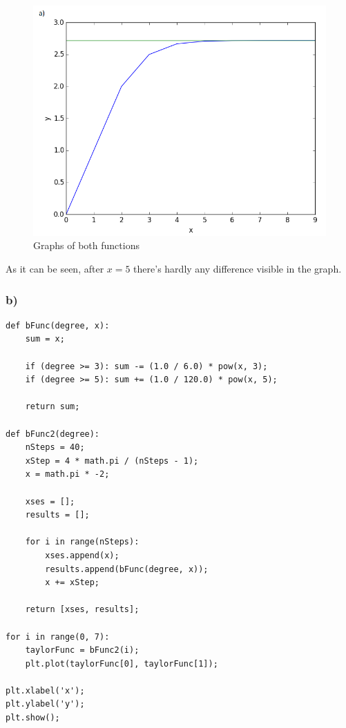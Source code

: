 \begin{figure}[!ht]
\includegraphics[width=1\textwidth]{chapters/images/figure-2-4-a}
\caption{Graphs of both functions}
\end{figure}

As it can be seen, after $x = 5$ there's hardly any difference visible in the graph.


\subsubsection{b)}

\begin{lstlisting}[caption=Problem 2.4 b)]
def bFunc(degree, x):
	sum = x;
	
	if (degree >= 3): sum -= (1.0 / 6.0) * pow(x, 3);
	if (degree >= 5): sum += (1.0 / 120.0) * pow(x, 5);
	
	return sum;

def bFunc2(degree):
	nSteps = 40;
	xStep = 4 * math.pi / (nSteps - 1);
	x = math.pi * -2;
	
	xses = [];
	results = [];
	
	for i in range(nSteps):
		xses.append(x);
		results.append(bFunc(degree, x));
		x += xStep;
	
	return [xses, results];

for i in range(0, 7):
	taylorFunc = bFunc2(i);
	plt.plot(taylorFunc[0], taylorFunc[1]);

plt.xlabel('x');
plt.ylabel('y');
plt.show();
\end{lstlisting}


